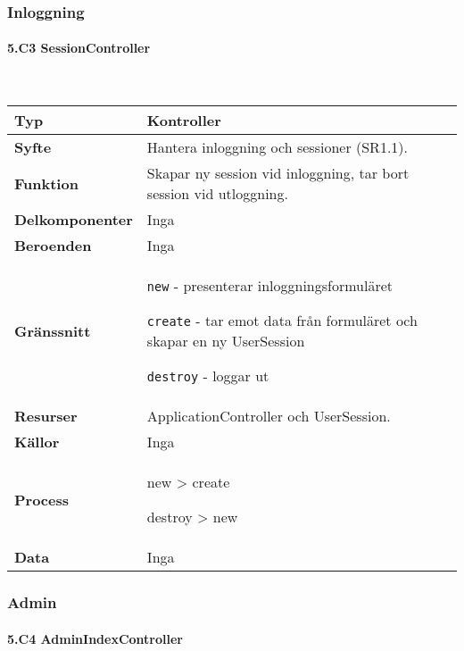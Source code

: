 \documentclass[a4paper, twoside, 11pt, titlepage]{article}
\begin{document}
		\subsubsection{Inloggning}



			\paragraph{5.C3 SessionController}\

			\begin {table} [ht] \begin{tabular} {  p{3.5cm} p{11.6cm} }
				\hline
				{\sffamily\textbf{Typ}} & {Kontroller} \\
				\hline
				{\sffamily\textbf{Syfte}} & {Hantera inloggning och sessioner (SR1.1).} \\
				\hline
				{\sffamily\textbf{Funktion}} & {Skapar ny session vid inloggning, tar bort session vid utloggning.} \\
				\hline
				{\sffamily\textbf{Delkomponenter}} & {Inga} \\
				\hline
				{\sffamily\textbf{Beroenden}} & {Inga} \\
				\hline
				{\sffamily\textbf{Gränssnitt}} & {{\tt new} - presenterar inloggningsformuläret

{\tt create} - tar emot data från formuläret och skapar en ny UserSession

{\tt destroy} - loggar ut} \\
				\hline
				{\sffamily\textbf{Resurser}} & {ApplicationController och UserSession.} \\
				\hline
				{\sffamily\textbf{Källor}} & {Inga} \\
				\hline
				{\sffamily\textbf{Process}} & {new > create

destroy > new} \\
				\hline
				{\sffamily\textbf{Data}} & {Inga} \\
				\hline
			\end{tabular} \end{table} \FloatBarrier


		\clearpage %
		\subsubsection{Admin}



			\paragraph{5.C4 AdminIndexController}\
\end{document}
